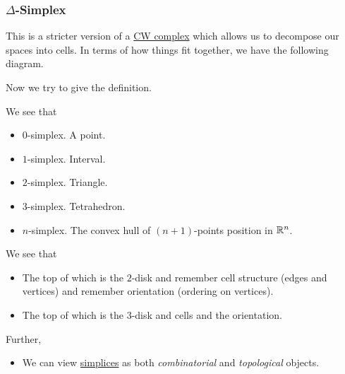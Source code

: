 \subsubsection{\(\Delta\)-Simplex}
This is a stricter version of a \hyperref[def:CW-Complex]{CW complex} which allows us to decompose our spaces into cells. In terms of how things fit together, we have
the following diagram.
\begin{figure}[H]
	\centering
	\label{fig:simplical-homology-venn-diagram}
\end{figure}

Now we try to give the definition.
\begin{definition}[Simplex]\label{def:simplex}
	We see that
	\begin{itemize}
		\item \(0\)-simplex. A point.
		\item \(1\)-simplex. Interval.
		\item \(2\)-simplex. Triangle.
		\item \(3\)-simplex. Tetrahedron.
		\item \(n\)-simplex. The convex hull of \((n+1)\)-points position in \(\mathbb{\MakeUppercase{r}} ^n\).
	\end{itemize}
	\begin{figure}[H]
		\centering
		\label{fig:def:simplex}
	\end{figure}
\end{definition}
\begin{remark}
	We see that
	\begin{itemize}
		\item The top of which is the \(2\)-disk and remember cell structure (edges and vertices) and remember orientation (ordering on vertices).
		\item The top of which is the \(3\)-disk and cells and the orientation.
	\end{itemize}
	Further,
	\begin{itemize}
		\item We can view \hyperref[def:simplex]{simplices} as both \emph{combinatorial} and \emph{topological} objects.
	\end{itemize}
\end{remark}

